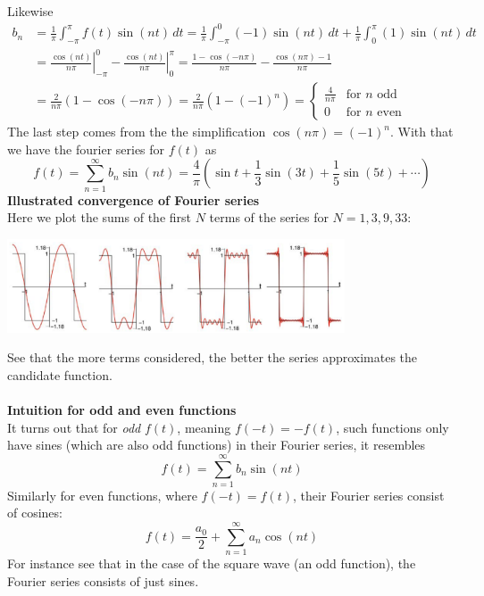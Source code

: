 \documentclass{report}
\begin{document}
Likewise
\begin{align*}
b_n&=\frac{1}{\pi}\int^\pi_{-\pi}f(t)\sin(nt)\,dt=
\frac{1}{\pi}\int^0_{-\pi}(-1)\sin(nt)\,dt+\frac{1}{\pi}\int^\pi_{0}(1)\sin(nt)\,dt\\
&=\left.\frac{\cos(nt)}{n\pi}\right|_{-\pi}^0-\left.\frac{\cos(nt)}{n\pi}\right|^{\pi}_0
=\frac{1-\cos(-n\pi)}{n\pi}-\frac{\cos(n\pi)-1}{n\pi}\\
&=\frac{2}{n\pi}(1-\cos(-n\pi))=\frac{2}{n\pi}(1-(-1)^n)
=\begin{cases}
\frac{4}{n\pi}&\text{for $n$ odd}\\
0&\text{for $n$ even}
\end{cases}
\end{align*}
The last step comes from the the simplification $\cos(n\pi)=(-1)^n$.
With that we have the fourier series for $f(t)$ as
\begin{equation*}
f(t)=\sum^\infty_{n=1}b_n\sin(nt)=\frac{4}{\pi}\left(
\sin t+\frac{1}{3}\sin(3t)+\frac{1}{5}\sin(5t)+\cdots\right)
\end{equation*}
\textbf{Illustrated convergence of Fourier series}\\
Here we plot the sums of the first $N$ terms of the series for $N=1,3,9,33$:
\begin{center}
\includegraphics[width=10cm]{37}\\
\end{center}
See that the more terms considered, the better the series approximates the candidate function.\\
\vspace{1mm}\\
\textbf{Intuition for odd and even functions}\\
It turns out that for \textit{odd} $f(t)$, meaning $f(-t)=-f(t)$, such functions only have sines (which
are also odd functions) in their Fourier series, it resembles
\begin{equation*}
f(t)=\sum^\infty_{n=1}b_n\sin(nt)
\end{equation*}
Similarly for even functions, where $f(-t)=f(t)$, their Fourier series consist of cosines:
\begin{equation*}
f(t)=\frac{a_0}{2}+\sum^\infty_{n=1}a_n\cos(nt)
\end{equation*}
For instance see that in the case of the square wave (an odd function), the Fourier series consists of just sines.
\newpage
\end{document}
